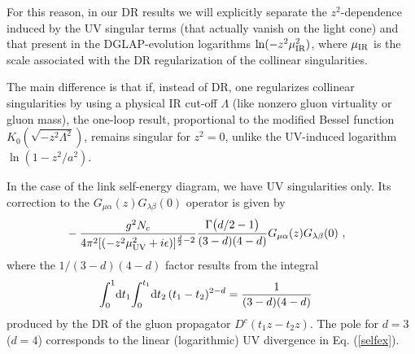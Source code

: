 For this reason, in our DR results we will explicitly separate
the \mbox{$z^2$-dependence} induced by the UV singular terms
(that actually vanish on the light cone)
and
that present in the DGLAP-evolution
logarithms $\ln (-z^2 \mu_{\rm IR}^2)$, where $\mu_{\rm IR}$ is the scale
associated with the DR regularization of the collinear singularities.

The main difference is that if, instead of DR, one regularizes collinear singularities
by using a physical IR cut-off $\Lambda$ (like nonzero gluon virtuality or gluon mass),
the one-loop result, proportional to the modified Bessel function $K_0 (\sqrt{-z^2 \Lambda^2})$, remains
singular for $z^2=0$, unlike the UV-induced logarithm
$\ln (1-z^2/a^2)$.

In the case of the link self-energy diagram, we have UV singularities only.
Its correction to the $G_{\mu \alpha}(z)G_{\lambda \beta}(0)$ operator is given by
\begin{align}
&
-{g^2N_c \over 4\pi^2[(-z^2 \mu_{\rm UV}^2 +i\epsilon)]^{{d\over 2}-2}} {\Gamma\big({d/ 2}-1\big) \over (3-d)(4-d)}G_{\mu\alpha}(z)G_{\lambda \beta }(0) \ ,
\label{selfAD}
\end{align}
where the $1/(3-d)(4-d)$ factor results
from the integral
\begin{align}
&
\!\int_0^1\! \mathrm{d} t_1 \!\int_0^{t_1}\! \mathrm{d} t_2\, (t_1-t_2)^{2-d} ={1 \over (3-d)(4-d)}
\nonumber
\end{align}
produced by the DR of the gluon propagator \mbox{$D^c (t_1z - t_2 z)$.}
The pole for $d=3$ ($d=4$) corresponds to the linear (logarithmic) UV divergence
in Eq. (\ref{selfex}).
